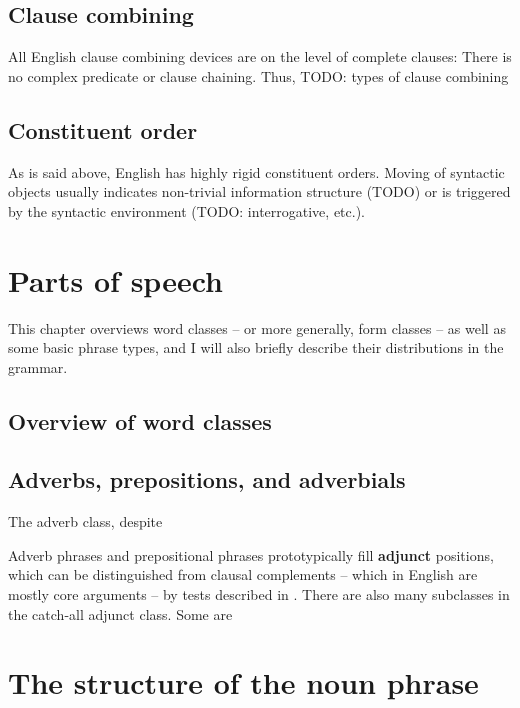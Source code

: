 \documentclass[UTF8, a4paper, oneside, scheme=plain]{ctexrep}
\newcommand*{\citesec}[1]{\S~{#1}}
\newcommand*{\citechap}[1]{Ch~{#1}}
\newcommand*{\citechapsec}[2]{\citechap{#1}.\citesec{#2}}
\newcommand*{\concept}[1]{\textbf{#1}}
\begin{document}
\section{Clause combining}\label{sec:clause-combining}

All English clause combining devices are on the level of complete clauses:
There is no complex predicate or clause chaining.
Thus, TODO: types of clause combining

\section{Constituent order}

As is said above, 
English has highly rigid constituent orders. 
Moving of syntactic objects usually indicates 
non-trivial information structure (TODO) 
or is triggered by the syntactic environment (TODO: interrogative, etc.).

\chapter{Parts of speech}

This chapter overviews word classes -- or more generally, form classes -- 
as well as some basic phrase types,
and I will also briefly describe their distributions in the grammar.

\section{Overview of word classes}



\section{Adverbs, prepositions, and adverbials}

The adverb class, despite 

Adverb phrases and prepositional phrases prototypically fill \concept{adjunct} positions, 
which can be distinguished from clausal complements -- which in English are mostly core arguments
-- by tests described in \citet[\citechapsec{4}{1.2}]{cgel}.
There are also many subclasses in the catch-all adjunct class.
Some are 

\chapter{The structure of the noun phrase}\label{chap:np}
\end{document}
